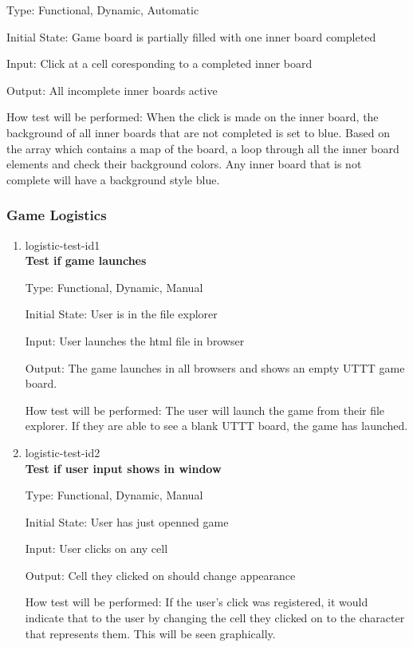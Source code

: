 \documentclass[12pt, titlepage]{article}
\begin{document}
\begin{enumerate}
Type: Functional, Dynamic, Automatic
					
Initial State: Game board is partially filled with one inner board completed

Input: Click at a cell coresponding to a completed inner board
					
Output: All incomplete inner boards active
					
How test will be performed: When the click is made on the inner board, the background of all inner boards that are not completed is set to blue. Based on the array which contains a map of the board, a loop through all the inner board elements and check their background colors. Any inner board that is not complete will have a background style blue.

\end{enumerate}

\subsubsection{Game Logistics}

\begin{enumerate}

\item{logistic-test-id1\\}
\textbf{Test if game launches}

Type: Functional, Dynamic, Manual
					
Initial State: User is in the file explorer
					
Input: User launches the html file in browser
					
Output: The game launches in all browsers and shows an empty UTTT game board. 
					
How test will be performed: The user will launch the game from their file explorer. If they are able to see a blank UTTT board, the game has launched.

\item{logistic-test-id2\\}
\textbf{Test if user input shows in window}

Type: Functional, Dynamic, Manual
					
Initial State: User has just openned game
					
Input: User clicks on any cell
					
Output: Cell they clicked on should change appearance
					
How test will be performed: If the user's click was registered, it would indicate that to the user by changing the cell they clicked on to the character that represents them. This will be seen graphically.

\end{enumerate}
\end{document}
